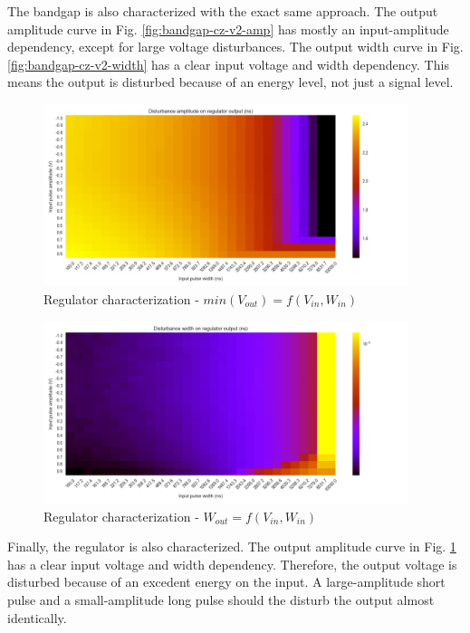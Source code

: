 The bandgap is also characterized with the exact same approach.
The output amplitude curve in Fig. \ref{fig:bandgap-cz-v2-amp} has mostly an input-amplitude dependency, except for large voltage disturbances.
The output width curve in Fig. \ref{fig:bandgap-cz-v2-width} has a clear input voltage and width dependency.
This means the output is disturbed because of an energy level, not just a signal level.

\begin{figure}[!htb]
  \centering
  \includegraphics[width=0.95\textwidth]{src/4/figures/regulator_cz_V2_amplitude.png}
  \caption{Regulator characterization - $min(V_{out}) = f(V_{in}, W_{in})$}
  \label{fig:reg-cz-v2-amp}
\end{figure}

\begin{figure}[!htb]
  \centering
  \includegraphics[width=0.95\textwidth]{src/4/figures/regulator_cz_V2_width.png}
  \caption{Regulator characterization - $W_{out} = f(V_{in}, W_{in})$}
  \label{fig:reg-cz-v2-width}
\end{figure}

Finally, the regulator is also characterized.
The output amplitude curve in Fig. \ref{fig:reg-cz-v2-amp} has a clear input voltage and width dependency.
Therefore, the output voltage is disturbed because of an excedent energy on the input.
A large-amplitude short pulse and a small-amplitude long pulse should the disturb the output almost identically.

